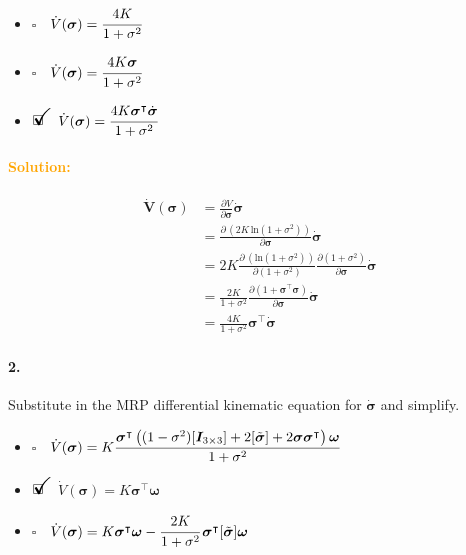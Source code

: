 \documentclass[12pt, a4paper]{article}
\newcommand{\ans}{\item[]$\rlap{\LARGE{\checkmark}}\square\quad$}
\newcommand{\noans}{\item[]$\square\quad$}
\begin{document}
\begin{itemize}
\noans $\dot{V}(\bm{\sigma}) = \cfrac{4K}{1+\sigma^{2}}$
\noans $\dot{V}(\bm{\sigma}) = \cfrac{4K\bm{\sigma}}{1+\sigma^{2}}$
\ans $\dot{V}(\bm{\sigma}) = \cfrac{4K \bm{\sigma}^{\intercal}\dot{\bm{\sigma}}}{1+\sigma^{2}}$
\end{itemize}

\paragraph{\textcolor{orange}{Solution:}}
\begin{equation*}
    \begin{split}
        \dot{\bm{V}}(\bm{\sigma})&=\frac{\partial V}{\partial\bm{\sigma}}\dot{\bm{\sigma}}\\
        &=\frac{\partial\,(2K\,\text{ln}(1+\sigma^{2}))}{\partial\bm{\sigma}}\dot{\bm{\sigma}}\\
        &=2K\frac{\partial\,(\text{ln}(1+\sigma^{2}))}{\partial(1+\sigma^{2})}\frac{\partial(1+\sigma^{2})}{\partial\bm{\sigma}}\dot{\bm{\sigma}}\\
        &=\frac{2K}{1+\sigma^{2}}\frac{\partial(1+\bm{\sigma}^{\intercal}\bm{\sigma})}{\partial\bm{\sigma}}\dot{\bm{\sigma}}\\
        &=\frac{4K}{1+\sigma^{2}}\bm{\sigma}^{\intercal}\dot{\bm{\sigma}}
    \end{split}
\end{equation*}

\paragraph{2.} Substitute in the MRP differential kinematic equation for $\dot{\bm{\sigma}}$ and simplify.

\begin{itemize}
\noans $\dot{V}(\bm{\sigma}) = K\cfrac{\bm{\sigma}^{\intercal}\left((1-\sigma^{2})[\bm{I}_{3\times3}]+2[\tilde{\bm{\sigma}}]+2\bm{\sigma}\bm{\sigma}^{\intercal}\right)\bm{\omega}}{1+\sigma^{2}}$
\ans $\dot{V}(\bm{\sigma}) = K\bm{\sigma}^{\intercal}\bm{\omega}$
\noans $\dot{V}(\bm{\sigma}) = K\bm{\sigma}^{\intercal}\bm{\omega} - \cfrac{2K}{1+\sigma^{2}}\,\bm{\sigma}^{\intercal}[\tilde{\bm{\sigma}}]\bm{\omega}$
\end{itemize}
\end{document}
